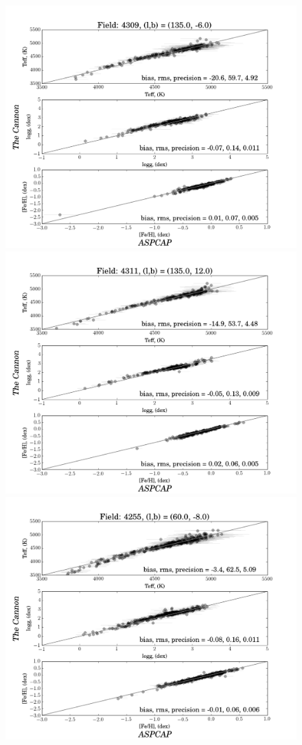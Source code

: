 \documentclass[12pt, preprint]{aastex}
\begin{document}
\begin{figure}[!h]
        \includegraphics[scale=0.23]{./plots/4309_v19.png} \\
              \includegraphics[scale=0.23]{./plots/4311_v19.png}
        \includegraphics[scale=0.23]{./plots/4255_v19.png} 

\end{figure}
\end{document}
